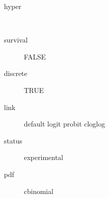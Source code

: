 \begin{description}
	\item[hyper]\ 
	 \item[ survival ] FALSE 
	 \item[ discrete ] TRUE 
	 \item[ link ] default logit probit cloglog 
	 \item[ status ] experimental 
	 \item[ pdf ] cbinomial 
\end{description}
